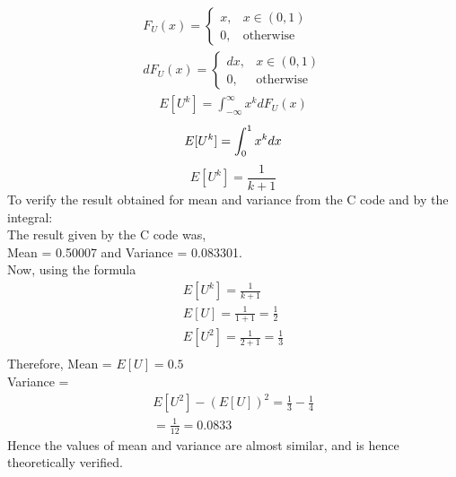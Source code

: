 \documentclass[journal,12pt,two column]{IEEEtran}
\begin{document}
\begin{align}  
F_U(x) = \begin{cases}
x, & x\in (0,1) \\
0, & \text{otherwise}
\end{cases}
\\dF_U(x) = \begin{cases}
dx, & x\in (0,1) \\
0, & \text{otherwise}
\end{cases}
\end{align}
\begin{align} 
E[U^{k}] = \int_{-\infty}^{\infty} x^{k}dF_U(x)
\end{align}
\begin{equation}
    E[U^{k}] = \int_{0}^{1} x^{k}dx \\
\end{equation}
\begin{equation}
    E[U^{k}] = \frac{1}{k+1}
\end{equation}
To verify the result obtained for mean and variance from the C code and by the integral:\\
The result given by the C code was,\\Mean = 0.50007 and Variance = 0.083301.\\
Now, using the formula 
\begin{align}
    E[U^{k}] = \frac{1}{k+1}\\
    E[U] = \frac{1}{1+1} = \frac{1}{2}\\
    E[U^2] = \frac{1}{2+1} = \frac{1}{3}\\
\end{align}
Therefore, Mean = $E[U] = 0.5$\\
Variance = \\
\begin{align}
    E[U^2] - (E[U])^2 = \frac{1}{3} - \frac{1}{4}\\
    =\frac{1}{12} = 0.0833
\end{align}
Hence the values of mean and variance are almost similar, and is hence theoretically verified.
\end{document}
